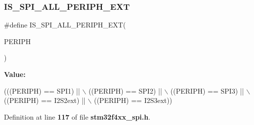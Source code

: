 \subsubsection{I\+S\+\_\+\+S\+P\+I\+\_\+\+A\+L\+L\+\_\+\+P\+E\+R\+I\+P\+H\+\_\+\+E\+XT}
{\footnotesize\ttfamily \#define I\+S\+\_\+\+S\+P\+I\+\_\+\+A\+L\+L\+\_\+\+P\+E\+R\+I\+P\+H\+\_\+\+E\+XT(\begin{DoxyParamCaption}\item[{}]{P\+E\+R\+I\+PH }\end{DoxyParamCaption})}

{\bfseries Value\+:}
\begin{DoxyCode}
(((PERIPH) == SPI1) || \(\backslash\)
                                       ((PERIPH) == SPI2) || \(\backslash\)
                                       ((PERIPH) == SPI3) || \(\backslash\)
                                       ((PERIPH) == I2S2ext) || \(\backslash\)
                                       ((PERIPH) == I2S3ext))
\end{DoxyCode}


Definition at line \textbf{ 117} of file \textbf{ stm32f4xx\+\_\+spi.\+h}.

